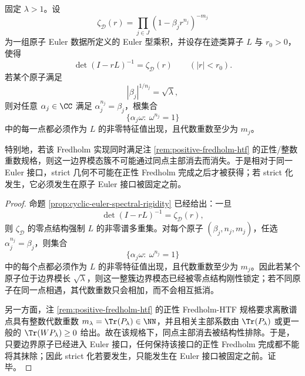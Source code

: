 \begin{theorem}\label{thm:conclusion-positive-fredholm-boundary-obstruction}
固定 \(\lambda>1\)。设
\[
\zeta_{\mathcal D}(r)=\prod_{j\in J}(1-\beta_j r^{n_j})^{-m_j}
\]
为一组原子 Euler 数据所定义的 Euler 型乘积，并设存在迹类算子 \(L\) 与 \(r_0>0\)，使得
\[
\det(I-rL)^{-1}=\zeta_{\mathcal D}(r)
\qquad (|r|<r_0).
\]
若某个原子满足
\[
|\beta_j|^{1/n_j}=\sqrt{\lambda},
\]
则对任意 \(\alpha_j\in\CC\) 满足 \(\alpha_j^{n_j}=\beta_j\)，根集合
\[
\{\alpha_j\omega:\ \omega^{n_j}=1\}
\]
中的每一点都必须作为 \(L\) 的非零特征值出现，且代数重数至少为 \(m_j\)。

特别地，若该 Fredholm 实现同时满足注 \ref{rem:positive-fredholm-htf} 的正性/整数重数规格，则这一边界模态簇不可能通过同点主部消去而消失。于是相对于同一 Euler 接口，strict 几何不可能在正性 Fredholm 完成之后才被获得；若 strict 化发生，它必须发生在原子 Euler 接口被固定之前。
\end{theorem}
\begin{proof}
命题 \ref{prop:cyclic-euler-spectral-rigidity} 已经给出：一旦
\[
\det(I-rL)^{-1}=\zeta_{\mathcal D}(r),
\]
则 \(\zeta_{\mathcal D}\) 的零点结构强制 \(L\) 的非零谱多重集。对每个原子 \((\beta_j,n_j,m_j)\)，任选 \(\alpha_j^{n_j}=\beta_j\)，则集合
\[
\{\alpha_j\omega:\ \omega^{n_j}=1\}
\]
中的每个点都必须作为 \(L\) 的非零特征值出现，且代数重数至少为 \(m_j\)。因此若某个原子位于边界模长 \(\sqrt{\lambda}\)，则这一整簇边界模态已经被零点结构刚性锁定；若不同原子在同一点相遇，其代数重数只会相加，而不会相互抵消。

另一方面，注 \ref{rem:positive-fredholm-htf} 的正性 Fredholm-HTF 规格要求离散谱点具有整数代数重数 \(m_\lambda=\Tr(P_\lambda)\in\NN\)，并且相关主部系数由 \(\Tr(P_\lambda)\) 或更一般的 \(\Tr(WP_\lambda)\ge 0\) 给出。故在该规格下，同点主部消去被结构性排除。于是，只要边界原子已经进入 Euler 接口，任何保持该接口的正性 Fredholm 完成都不能将其抹除；因此 strict 化若要发生，只能发生在 Euler 接口被固定之前。证毕。
\end{proof}

